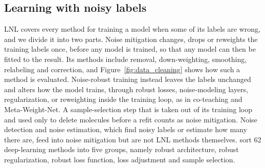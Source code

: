 \subsection{Learning with noisy labels}\label{sec:lnl_background}

LNL covers every method for training a model when some of its labels are wrong, and we divide it into two parts. Noise mitigation changes, drops or reweights the training labels once, before any model is trained, so that any model can then be fitted to the result. Its methods include removal, down-weighting, smoothing, relabeling and correction, and Figure~\ref{fig:data_cleaning} shows how such a method is evaluated. Noise-robust training instead leaves the labels unchanged and alters how the model trains, through robust losses, noise-modeling layers, regularization, or reweighting inside the training loop, as in co-teaching and Meta-Weight-Net. A sample-selection step that is taken out of its training loop and used only to delete molecules before a refit counts as noise mitigation. Noise detection and noise estimation, which find noisy labels or estimate how many there are, feed into noise mitigation but are not LNL methods themselves. \citet{Song2022} sort 62 deep-learning methods into five groups, namely robust architecture, robust regularization, robust loss function, loss adjustment and sample selection.

